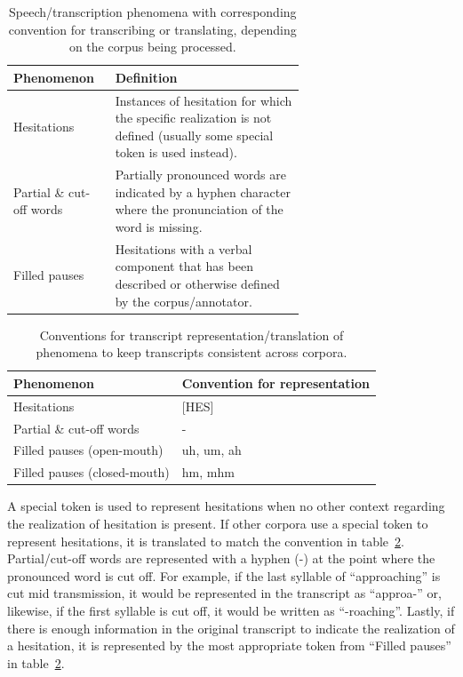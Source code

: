 \documentclass[12pt]{article}
\begin{document}
\begin{table}[!t]
    \centering
    \begin{tabular}{l p{0.65\linewidth}}
        \toprule
        Phenomenon               & Definition                                                                                                              \\
        \midrule
        Hesitations              & Instances of hesitation for which the specific realization is not defined (usually some special token is used instead). \\
        \midrule
        Partial \& cut-off words & Partially pronounced words are indicated by a hyphen character where the pronunciation of the word is missing.          \\
        \midrule
        Filled pauses            & Hesitations with a verbal component that has been described or otherwise defined by the corpus/annotator.               \\
        \bottomrule
    \end{tabular}
    \caption{Speech/transcription phenomena with corresponding convention for transcribing or translating, depending on the corpus being processed.}
    \label{tab:phenomena_definitions}
\end{table}



\begin{table}[!t]
    \centering
    \begin{tabular}{l l}
        \toprule
        Phenomenon                   & Convention for representation \\
        \midrule
        Hesitations                  & [HES]                         \\
        \midrule
        Partial \& cut-off words     & -                             \\
        \midrule
        Filled pauses (open-mouth)   & uh, um, ah                    \\
        \midrule
        Filled pauses (closed-mouth) & hm, mhm                       \\
        \bottomrule
    \end{tabular}
    \caption{Conventions for transcript representation/translation of phenomena to keep transcripts consistent across corpora.}
    \label{tab:phenomena_conventions}
\end{table}

A special token is used to represent hesitations when no other context regarding the realization of hesitation is present. If other corpora use a
special token to represent hesitations, it is translated to match the convention in table~\ref{tab:phenomena_conventions}. Partial/cut-off words
are represented with a hyphen (-) at the point where the pronounced word is cut off. For example, if the last syllable of ``approaching'' is cut
mid transmission, it would be represented in the transcript as ``approa-'' or, likewise, if the first syllable is cut off, it would be written as
``-roaching''. Lastly, if there is enough information in the original transcript to indicate the realization of a hesitation, it is represented by
the most appropriate token from ``Filled pauses'' in table~\ref{tab:phenomena_conventions}.
\end{document}
